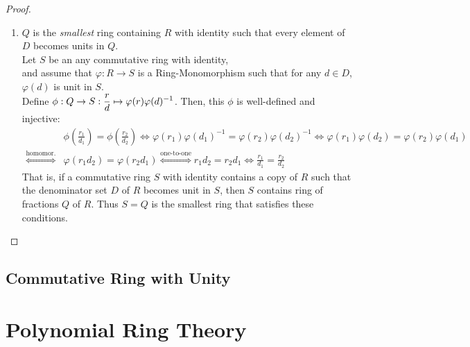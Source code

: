 \begin{proof}
\begin{enumerate}
\begin{enumerate}[label=\theenumi-\arabic*.]
            \item Well-Defined and Injective: 
            $\dis \iota (r_1) = \iota (r_2)
            \iff \frac{r_1 p}{p} = \frac{r_2 f}{f}
            \iff (r_1 - r_2) pp = 0
            \iff r_1 = r_2$
            \item For any $d \in D$, $\iota(d)$ is a unit of $Q$: Put $\dis (\iota(d))^{-1} \defequal \frac{p}{dp}$, then
            \begin{align*}
                \iota(d) \times (\iota(d))^{-1} = \frac{dp}{p} \times \frac{p}{dp} = \frac{dpp}{dpp} = 1_Q
            \end{align*}
            \noindent That is, $\iota$ is embedding from $R$ into $Q$ such that $\iota[D]$ becomes units of $Q$ except zero. \\
            Moreover, if $D = R \setminus \{0\}$, then $Q$ is field.
        \end{enumerate}
        \item $Q$ is the \textit{smallest} ring containing $R$ with identity such that every element of $D$ becomes units in $Q$. \\
        Let $S$ be an any commutative ring with identity, \\
        and assume that $\varphi:R \to S$ is a Ring-Monomorphism such that for any $d \in D$, $\varphi(d)$ is unit in $S$. \\
        Define $\displaystyle \phi:Q \to S:\frac{r}{d} \mapsto \varphi(r) \varphi(d)^{-1}$. Then, this $\phi$ is well-defined and injective:
        \begin{align*}
            &\phi \left(\frac{r_1}{d_1} \right) = \phi \left(\frac{r_2}{d_2} \right)
            \iff
            \varphi(r_1) \varphi(d_1)^{-1} = \varphi(r_2) \varphi(d_2)^{-1}
            \iff 
            \varphi(r_1) \varphi(d_2) = \varphi(r_2) \varphi(d_1)\\
            \overset{\text{homomor.}}{\iff}
            &\varphi(r_1 d_2) = \varphi(r_2 d_1) 
            \overset{\text{one-to-one}}{\iff}
            r_1 d_2 = r_2 d_1
            \iff
            \frac{r_1}{d_1} = \frac{r_2}{d_2}
        \end{align*}
        That is, if a commutative ring $S$ with identity contains a copy of $R$ such that the denominator set $D$ of $R$ becomes unit in $S$, then $S$ contains ring of fractions $Q$ of $R$.
        Thus $S = Q$ is the smallest ring that satisfies these conditions.
    \end{enumerate}
\end{proof}

\section{Commutative Ring with Unity}

\chapter{Polynomial Ring Theory}
